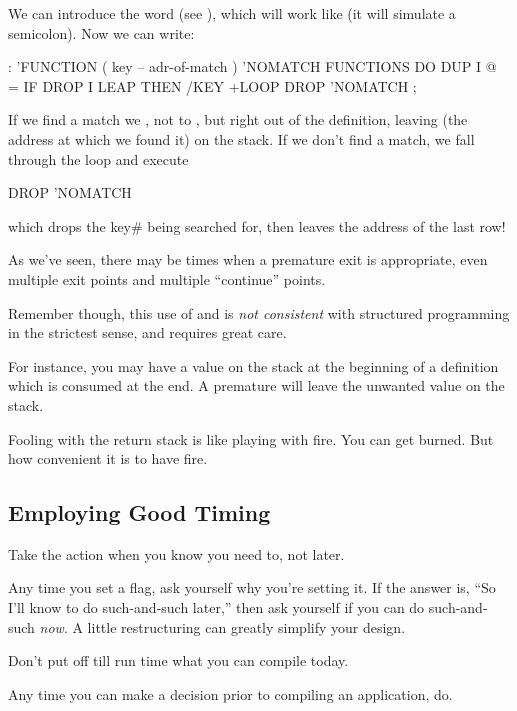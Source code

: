 We can introduce the word  (see ), which will work
like  (it will simulate a semicolon). Now we can write:

\begin{Code}
: 'FUNCTION  ( key -- adr-of-match )
   'NOMATCH FUNCTIONS DO  DUP  I @ =  IF  DROP I LEAP
   THEN  /KEY +LOOP  DROP  'NOMATCH ;
\end{Code}
If we find a match we , not to , but right out
of the definition, leaving  (the address at which we found it) on
the stack. If we don't find a match, we fall through the loop and execute

\begin{Code}
DROP  'NOMATCH
\end{Code}
which drops the key\# being searched for, then leaves the address of the
last row!

As we've seen, there may be times when a premature exit is appropriate,
even multiple exit points and multiple ``continue'' points.

Remember though, this use of  and  is
\emph{not consistent} with structured programming in the strictest sense,
and requires great care.

For instance, you may have a value on the stack at the beginning of a
definition which is consumed at the end. A premature  will
leave the unwanted value on the stack.

Fooling with the return stack is like playing with fire. You can get
burned. But how convenient it is to have fire.%
%

\subsection{Employing Good Timing}%

\begin{tip}
Take the action when you know you need to, not later.
\end{tip}
Any time you set a flag, ask yourself why you're setting it. If the answer
is, ``So I'll know to do such-and-such later,'' then ask yourself if you
can do such-and-such \emph{now}. A little restructuring can greatly
simplify your design.

\begin{tip}
Don't put off till run time what you can compile today.
\end{tip}
Any time you can make a decision prior to compiling an application, do.


